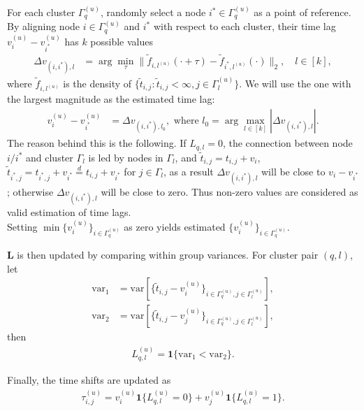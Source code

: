 For each cluster $\Gamma_q^{(u)}$, randomly select a node $i^*\in\Gamma_q^{(u)}$ as a point of reference. 
By aligning node $i\in\Gamma_q^{(u)}$ and $i^*$ with respect to each cluster,
their time lag $v_i^{(u)}-v_{i^*}^{(u)}$ has $k$ possible values
\begin{align*}
	\Delta v_{(i,i^*),l} 
	&=  \arg\min_{\tau} 
	\| \tilde f_{i,l^{(u)}}(\cdot+\tau) 
	- \tilde f_{i^*,l^{(u)}}(\cdot)\|_2 , \quad l\in[k],
\end{align*}
where $\tilde f_{i,l^{(u)}}$ is the density of $\{\tilde t_{i,j}: \tilde t_{i,j}<\infty, j\in\Gamma_l^{(u)} \}$.
We will use the one with the largest magnitude as the estimated time lag:
\begin{align}
v_i^{(u)}-v_{i^*}^{(u)} 
&= \Delta v_{(i,i^*),l_0} ,  \text{ where }  l_0 = \arg\max_{l\in[k]} |\Delta v_{(i,i^*),l}|.
\label{eq: align i and i^*}
\end{align}
The reason behind this is the following. 
If $L_{q,l}=0$, the connection between node $i/i^*$ and cluster $\Gamma_l$ is led by nodes in $\Gamma_l$, and $\tilde t_{i,j}=t_{i,j}+v_i$, $\tilde t_{i^*,j}=t_{i^*,j}+v_{i^*}\overset{d}{=}t_{i,j}+v_{i^*}$ for $j\in\Gamma_l$, 
as a result $\Delta v_{(i,i^*),l}$ will be close to $v_i - v_{i^*}$; 
otherwise $\Delta v_{(i,i^*),l}$ will be close to zero.
Thus non-zero values are considered as valid estimation of time lags.
\\
Setting $\min\{v_i^{(u)}\}_{i\in\Gamma_q^{(u)}}$ as zero yields estimated $\{v_i^{(u)}\}_{i\in\Gamma_q^{(u)}}$. 

$\mathbf{L}$ is then updated by comparing within group variances.
For cluster pair $(q,l)$, 
let 
\begin{align*}
\text{var}_1 &= \text{var}\left[\{ \tilde t_{i,j}-v_i^{(u)} \}_{i\in\Gamma_q^{(u)}, j\in\Gamma_l^{(u)}}\right],
\\
\text{var}_2 &= \text{var}\left[\{ \tilde t_{i,j}-v_j^{(u)} \}_{i\in\Gamma_q^{(u)}, j\in\Gamma_l^{(u)}}\right],
\end{align*}
then
\begin{align}
L_{q,l}^{(u)} = \mathbf{1}\{\text{var}_1 < \text{var}_2\}.
\end{align}


Finally, the time shifts are updated as
\begin{align}
\tau_{i,j}^{(u)} = v_i^{(u)} \mathbf{1} \{L_{q,l}^{(u)}=0\} + v_j^{(u)} \mathbf{1} \{L_{q,l}^{(u)}=1\}
.
\label{eq: update time shifts}
\end{align}


